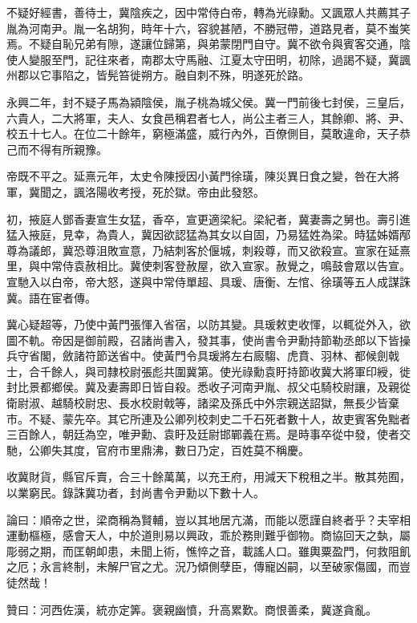 \begin{pinyinscope}
不疑好經書，善待士，冀陰疾之，因中常侍白帝，轉為光祿勳。又諷眾人共薦其子胤為河南尹。胤一名胡狗，時年十六，容貌甚陋，不勝冠帶，道路見者，莫不蚩笑焉。不疑自恥兄弟有隙，遂讓位歸第，與弟蒙閉門自守。冀不欲令與賓客交通，陰使人變服至門，記往來者，南郡太守馬融、江夏太守田明，初除，過謁不疑，冀諷州郡以它事陷之，皆髡笞徙朔方。融自刺不殊，明遂死於路。

永興二年，封不疑子馬為潁陰侯，胤子桃為城父侯。冀一門前後七封侯，三皇后，六貴人，二大將軍，夫人、女食邑稱君者七人，尚公主者三人，其餘卿、將、尹、校五十七人。在位二十餘年，窮極滿盛，威行內外，百僚側目，莫敢違命，天子恭己而不得有所親豫。

帝既不平之。延熹元年，太史令陳授因小黃門徐璜，陳災異日食之變，咎在大將軍，冀聞之，諷洛陽收考授，死於獄。帝由此發怒。

初，掖庭人鄧香妻宣生女猛，香卒，宣更適梁紀。梁紀者，冀妻壽之舅也。壽引進猛入掖庭，見幸，為貴人，冀因欲認猛為其女以自固，乃易猛姓為梁。時猛姊婿邴尊為議郎，冀恐尊沮敗宣意，乃結刺客於偃城，刺殺尊，而又欲殺宣。宣家在延熹里，與中常侍袁赦相比。冀使刺客登赦屋，欲入宣家。赦覺之，鳴鼓會眾以告宣。宣馳入以白帝，帝大怒，遂與中常侍單超、具瑗、唐衡、左悺、徐璜等五人成謀誅冀。語在宦者傳。

冀心疑超等，乃使中黃門張惲入省宿，以防其變。具瑗敕吏收惲，以輒從外入，欲圖不軌。帝因是御前殿，召諸尚書入，發其事，使尚書令尹勳持節勒丞郎以下皆操兵守省閣，斂諸符節送省中。使黃門令具瑗將左右廄騶、虎賁、羽林、都候劍戟士，合千餘人，與司隸校尉張彪共圍冀第。使光祿勳袁盱持節收冀大將軍印綬，徙封比景都鄉侯。冀及妻壽即日皆自殺。悉收子河南尹胤、叔父屯騎校尉讓，及親從衛尉淑、越騎校尉忠、長水校尉戟等，諸梁及孫氏中外宗親送詔獄，無長少皆棄市。不疑、蒙先卒。其它所連及公卿列校刺史二千石死者數十人，故吏賓客免黜者三百餘人，朝廷為空，唯尹勳、袁盱及廷尉邯鄲義在焉。是時事卒從中發，使者交馳，公卿失其度，官府市里鼎沸，數日乃定，百姓莫不稱慶。

收冀財貨，縣官斥賣，合三十餘萬萬，以充王府，用減天下稅租之半。散其苑囿，以業窮民。錄誅冀功者，封尚書令尹勳以下數十人。

論曰：順帝之世，梁商稱為賢輔，豈以其地居亢滿，而能以愿謹自終者乎？夫宰相運動樞極，感會天人，中於道則易以興政，乖於務則難乎御物。商協回天之埶，屬彫弱之期，而匡朝卹患，未聞上術，憔悴之音，載謠人口。雖輿粟盈門，何救阻飢之厄；永言終制，未解尸官之尤。況乃傾側孽臣，傳寵凶嗣，以至破家傷國，而豈徒然哉！

贊曰：河西佐漢，統亦定筭。褒親幽憤，升高累歎。商恨善柔，冀遂貪亂。


\end{pinyinscope}